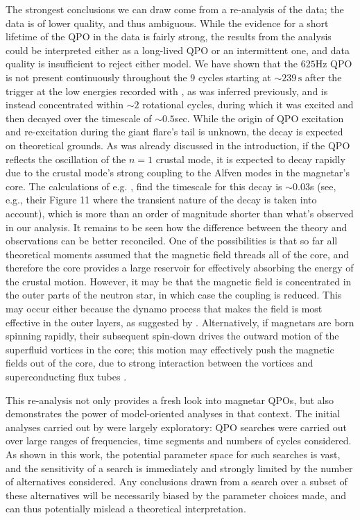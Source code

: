 \documentclass{emulateapj}
\begin{document}
The strongest conclusions we can draw come from a re-analysis of the \rxte data; the \rhessi data is of lower quality, and thus ambiguous. While the evidence for a short lifetime of the QPO in the \rxte data is fairly strong, the results from the \rhessi analysis could be interpreted either as a long-lived QPO or an intermittent one, and data quality is insufficient to reject either model.
 We have shown that the $625$Hz QPO is not present continuously throughout the $9$ cycles starting at $\sim 239 \, \mathrm{s}$ after the trigger at the low energies recorded with \rxte, as was inferred previously, and is instead concentrated within $\sim 2$ rotational cycles, during which it was excited and then decayed over the timescale
of $\sim 0.5$sec. While the origin of QPO excitation and re-excitation during the giant flare's tail is unknown, the
decay is expected on theoretical grounds. As was already discussed in the introduction, if the QPO reflects the oscillation of the $n=1$ crustal mode, it is expected to decay rapidly due to the crustal mode's strong coupling to the Alfven modes
in the magnetar's core. The calculations of e.g. \citet{vanHoven12}, find the timescale for this decay is $\sim 0.03$s (see, e.g., their Figure 11 where the transient nature of the decay is taken into account), which is more than an order of magnitude shorter than what's observed in our analysis. It remains to be seen how the difference between the theory and observations can be better reconciled. One of the possibilities is that so far 
all theoretical moments assumed that the magnetic field threads all of the core, and therefore the core provides a large reservoir for effectively absorbing the energy of the crustal motion. However, it may be that the magnetic field is concentrated in the outer parts of the neutron star, in which case the coupling is reduced. This may occur either because the dynamo process that makes the field is most effective in
the outer layers, as suggested by \citet{bonanno2006}. Alternatively, if magnetars are born spinning rapidly, their subsequent spin-down drives the outward motion of the superfluid vortices in the core; this motion may effectively push the magnetic fields out of the core, due to strong interaction between the vortices and superconducting flux tubes \citep{ruderman1998}.

This re-analysis not only provides a fresh look into magnetar QPOs, but also demonstrates the power of model-oriented analyses in that context. The initial analyses carried out by \citet{Israel05,Strohmayer06,Watts06} were largely exploratory: QPO searches were carried out over large ranges of frequencies, time segments and numbers of cycles considered. As shown in this work, the potential parameter space for such searches is vast, and the sensitivity of a search is immediately and strongly limited by the number of alternatives considered. Any conclusions drawn from a search over a subset of these alternatives will be necessarily biased by the parameter choices made, and can thus potentially mislead a theoretical interpretation.
\end{document}
